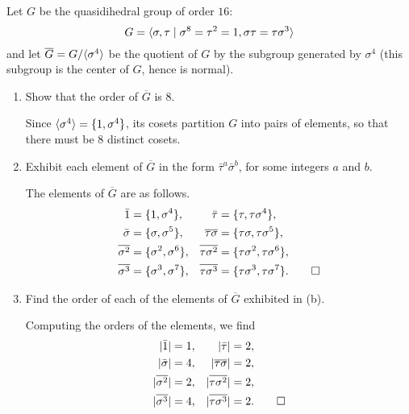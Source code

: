  Let $G$ be the quasidihedral group of order $16$:
\begin{equation*}
  G = \langle{\sigma, \tau\mid\sigma^8=\tau^2=1, \sigma\tau=\tau\sigma^3}\rangle
\end{equation*}
and let $\overline{G} = G/\langle{\sigma^4}\rangle$ be the quotient of $G$ by
the subgroup generated by $\sigma^4$ (this subgroup is the center of
$G$, hence is normal).
\begin{enumerate}
\item Show that the order of $\overline{G}$ is $8$.
  \begin{solution}
    Since $\langle{\sigma^4}\rangle = \{1,\sigma^4\}$, its cosets partition $G$
    into pairs of elements, so that there must be $8$ distinct cosets.
  \end{solution}

\item Exhibit each element of $\overline{G}$ in the form
  $\bar\tau^a\bar\sigma^b$, for some integers $a$ and $b$.
  \begin{solution}
    The elements of $\overline{G}$ are as follows.
    \begin{align*}
      \bar1 &= \{1, \sigma^4\},
      & \bar{\tau} &= \{\tau, \tau\sigma^4\}, \\
      \bar\sigma &= \{\sigma, \sigma^5\},
      & \overline{\tau\sigma} &= \{\tau\sigma, \tau\sigma^5\}, \\
      \overline{\sigma^2} &= \{\sigma^2, \sigma^6\},
      & \overline{\tau\sigma^2} &= \{\tau\sigma^2, \tau\sigma^6\}, \\
      \overline{\sigma^3} &= \{\sigma^3, \sigma^7\},
      & \overline{\tau\sigma^3} &= \{\tau\sigma^3, \tau\sigma^7\}. \qedhere
    \end{align*}
  \end{solution}

\item Find the order of each of the elements of $\overline{G}$
  exhibited in (b).
  \begin{solution}
    Computing the orders of the elements, we find
    \begin{align*}
      \lvert{\bar1}\rvert &= 1,
      & \lvert{\bar\tau}\rvert &= 2, \\
      \lvert{\bar\sigma}\rvert &= 4,
      & \lvert{\overline{\tau\sigma}}\rvert &= 2, \\
      \lvert{\overline{\sigma^2}}\rvert &= 2,
      & \lvert{\overline{\tau\sigma^2}}\rvert &= 2, \\
      \lvert{\overline{\sigma^3}}\rvert &= 4,
      & \lvert{\overline{\tau\sigma^3}}\rvert &= 2. \qedhere
    \end{align*}
  \end{solution}


\end{enumerate}
